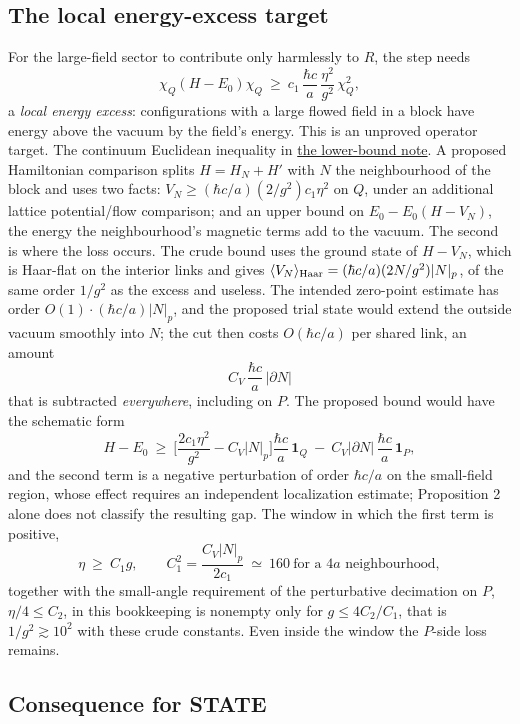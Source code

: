 \documentclass[11pt,a4paper]{article}
\begin{document}
\hypertarget{the-local-energy-excess-target}{%
\subsection{The local energy-excess
target}\label{the-local-energy-excess-target}}

For the large-field sector to contribute only harmlessly to \(R\), the
step needs
\[\chi_Q(H-E_0)\chi_Q\ \ge\ c_1\,\frac{\hbar c}{a}\,\frac{\eta^2}{g^2}\,\chi_Q^2 ,\]
a \emph{local energy excess}: configurations with a large flowed field
in a block have energy above the vacuum by the field's energy. This is
an unproved operator target. The continuum Euclidean inequality in
\href{large-field-action-lower-bound.md}{the lower-bound note}. A
proposed Hamiltonian comparison splits \(H=H_N+H'\) with \(N\) the
neighbourhood of the block and uses two facts:
\(V_N\ge(\hbar c/a)(2/g^2)c_1\eta^2\) on \(Q\), under an additional
lattice potential/flow comparison; and an upper bound on
\(E_0-E_0(H-V_N)\), the energy the neighbourhood's magnetic terms add to
the vacuum. The second is where the loss occurs. The crude bound uses
the ground state of \(H-V_N\), which is Haar-flat on the interior links
and gives \(\langle V_N\rangle_{\rm Haar}=(\hbar c/a)(2N/g^2)|N|_p\), of
the same order \(1/g^2\) as the excess and useless. The intended
zero-point estimate has order \(O(1)\cdot(\hbar c/a)|N|_p\), and the
proposed trial state would extend the outside vacuum smoothly into
\(N\); the cut then costs \(O(\hbar c/a)\) per shared link, an amount
\[C_V\,\frac{\hbar c}{a}\,|\partial N|\] that is subtracted
\emph{everywhere}, including on \(P\). The proposed bound would have the
schematic form
\[H-E_0\ \ge\ \Big[\frac{2c_1\eta^2}{g^2}-C_V|N|_p\Big]\frac{\hbar c}{a}\,\mathbf 1_Q
\ -\ C_V|\partial N|\,\frac{\hbar c}{a}\,\mathbf 1_P ,\] and the second
term is a negative perturbation of order \(\hbar c/a\) on the
small-field region, whose effect requires an independent localization
estimate; Proposition 2 alone does not classify the resulting gap. The
window in which the first term is positive,
\[\eta\ \ge\ C_1g,\qquad C_1^2=\frac{C_V|N|_p}{2c_1}\ \simeq\ 160\ \text{for a }4a\text{ neighbourhood},\]
together with the small-angle requirement of the perturbative decimation
on \(P\), \(\eta/4\le C_2\), in this bookkeeping is nonempty only for
\(g\le4C_2/C_1\), that is \(1/g^2\gtrsim10^2\) with these crude
constants. Even inside the window the \(P\)-side loss remains.

\hypertarget{consequence-for-state}{%
\subsection{Consequence for STATE}\label{consequence-for-state}}
\end{document}
